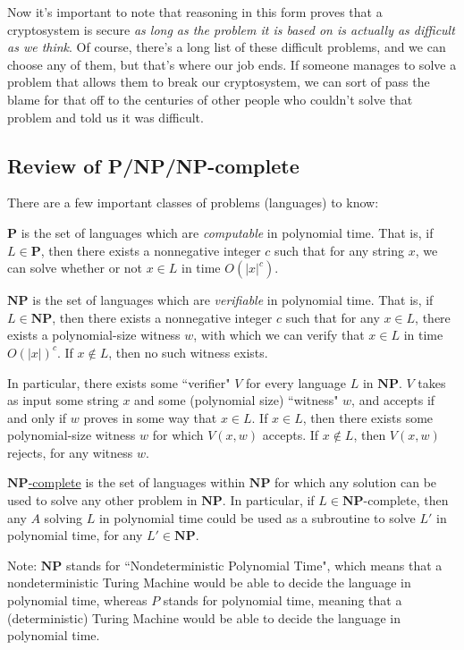 \documentclass[11pt]{article}
\renewcommand{\P}{\mathbf{P}}
\newcommand{\NP}{\mathbf{NP}}
\begin{document}
Now it's important to note that reasoning in this form proves that a cryptosystem is secure \emph{as long as the problem it is based on is actually as difficult as we think}. Of course, there's a long list of these difficult problems, and we can choose any of them, but that's where our job ends. If someone manages to solve a problem that allows them to break our cryptosystem, we can sort of pass the blame for that off to the centuries of other people who couldn't solve that problem and told us it was difficult.


\subsection{Review of P/NP/NP-complete}

There are a few important classes of problems (languages) to know:\bigskip

\underline{\(\P\)} is the set of languages which are \emph{computable} in polynomial time.  That is, if \(L\in\P\), then there exists a nonnegative integer \(c\) such that for any string \(x\), we can solve whether or not \(x\in L\) in time \(O(|x|^c)\).\medskip

\underline{\(\NP\)} is the set of languages which are \emph{verifiable} in polynomial time. That is, if \(L\in\NP\), then there exists a nonnegative integer \(c\) such that for any \(x\in L\), there exists a polynomial-size witness \(w\), with which we can verify that \(x\in L\) in time \(O(|x|)^c\). If \(x\notin L\), then no such witness exists. 

In particular, there exists some ``verifier" \(V\) for every language \(L\) in \(\NP\). \(V\) takes as input some string \(x\) and some (polynomial size) ``witness" \(w\), and accepts if and only if \(w\) proves in some way that \(x\in L\). If \(x\in L\), then there exists some polynomial-size witness \(w\) for which \(V(x,w)\) accepts. If \(x\notin L\), then \(V(x,w)\) rejects, for any witness \(w\).\medskip

\underline{\(\NP\)-complete} is the set of languages within \(\NP\) for which any solution can be used to solve any other problem in \(\NP\). In particular, if \(L\in\NP\)-complete, then any \(A\) solving \(L\) in polynomial time could be used as a subroutine to solve \(L'\) in polynomial time, for any \(L'\in\NP\).\bigskip

Note: \(\NP\) stands for ``Nondeterministic Polynomial Time", which means that a nondeterministic Turing Machine would be able to decide the language in polynomial time, whereas \(P\) stands for polynomial time, meaning that a (deterministic) Turing Machine would be able to decide the language in polynomial time. 
\end{document}
